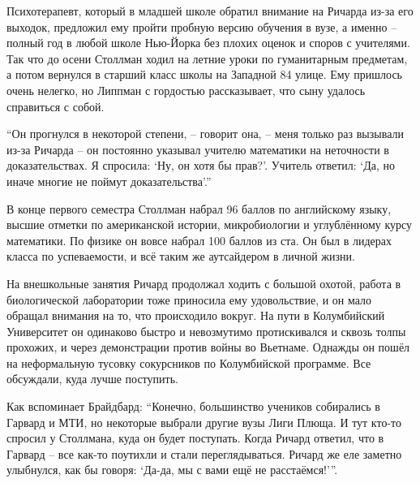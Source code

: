 Психотерапевт, который в младшей школе обратил внимание на Ричарда из-за его выходок, предложил ему пройти пробную версию обучения в вузе, а именно -- полный год в любой школе Нью-Йорка без плохих оценок и споров с учителями. Так что до осени Столлман ходил на летние уроки по гуманитарным предметам, а потом вернулся в старший класс школы на Западной 84 улице. Ему пришлось очень нелегко, но Липпман с гордостью рассказывает, что сыну удалось справиться с собой.

\enquote{Он прогнулся в некоторой степени, -- говорит она, -- меня только раз вызывали из-за Ричарда -- он постоянно указывал учителю математики на неточности в доказательствах. Я спросила: \enquote{Ну, он хотя бы прав?}. Учитель ответил: \enquote{Да, но иначе многие не поймут доказательства}.\hspace{0.01in}}

В конце первого семестра Столлман набрал 96 баллов по английскому языку, высшие отметки по американской истории, микробиологии и углублённому курсу математики. По физике он вовсе набрал 100 баллов из ста. Он был в лидерах класса по успеваемости, и всё таким же аутсайдером в личной жизни.

На внешкольные занятия Ричард продолжал ходить с большой охотой, работа в биологической лаборатории тоже приносила ему удовольствие, и он мало обращал внимания на то, что происходило вокруг. На пути в Колумбийский Университет он одинаково быстро и невозмутимо протискивался и сквозь толпы прохожих, и через демонстрации против войны во Вьетнаме. Однажды он пошёл на неформальную тусовку сокурсников по Колумбийской программе. Все обсуждали, куда лучше поступить.

Как вспоминает Брайдбард: \enquote{Конечно, большинство учеников собирались в Гарвард и МТИ, но некоторые выбрали другие вузы Лиги Плюща. И тут кто-то спросил у Столлмана, куда он будет поступать. Когда Ричард ответил, что в Гарвард -- все как-то поутихли и стали переглядываться. Ричард же еле заметно улыбнулся, как бы говоря: \enquote{Да-да, мы с вами ещё не расстаёмся!}\hspace{0.01in}}.

\theendnotes
\setcounter{endnote}{0}
